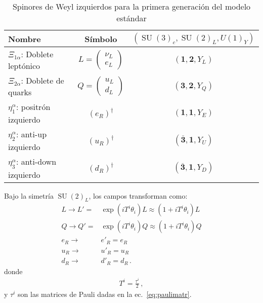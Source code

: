 \begin{frame}
\begin{table}
  \centering
  \begin{tabular}{l|c|c}\hline
    Nombre & Símbolo & $\left( \operatorname{SU}(3)_c, \operatorname{SU}(2)_L, U(1)_Y \right)$\\\hline
    $\Xi_{1\alpha}$: Doblete leptónico & $L=\displaystyle{\begin{pmatrix}
      \nu_L\\
      e_L      
    \end{pmatrix}}$ & $\left( \mathbf{1},\mathbf{2},Y_L \right)$\\
    $\Xi_{2\alpha}$: Doblete de quarks & $Q=\displaystyle{\begin{pmatrix}
      u_L\\
      d_L      
    \end{pmatrix}}$ & $\left( \mathbf{3},\mathbf{2},Y_Q \right)$\\
   $\eta^{\alpha}_1$: positrón izquierdo & $\left( e_R \right)^{\dagger}$&$\left(\mathbf{1},\mathbf{1},Y_{E}\right)$ \\
   $\eta^{\alpha}_2$: anti-up izquierdo & $\left( u_R \right)^{\dagger}$&$\left(\overline{\mathbf{3}},\mathbf{1},Y_{U}\right)$ \\
   $\eta^{\alpha}_3$: anti-down izquierdo & $\left( d_R \right)^{\dagger}$&$\left(\overline{\mathbf{3}},\mathbf{1},Y_{D}\right)$ \\
  \end{tabular}
  \caption{Spinores de Weyl izquierdos para la primera generación del modelo estándar}
  \label{tab:fgw}
\end{table}


Bajo la simetría $\operatorname{SU}(2)_L$, los campos transforman como:
 \begin{align}
  L\to L'=&\exp(i T^i \theta_i)L\approx(1+i T^i\theta_i)L\nonumber\\
  Q\to Q'=&\exp(i T^i \theta_i)Q\approx(1+i T^i\theta_i)Q\nonumber\\
  e_R\to& e'_R=e_R\nonumber\\
  u_R\to& u'_R=u_R\nonumber\\
  d_R\to& d'_R=d_R\,.
\end{align}
donde
\begin{align}
  T^i=\frac{\tau^i}{2}\,,
\end{align}
y $\tau^i$ son las matrices de Pauli dadas en la ec.~\eqref{eq:paulimatr}.

\end{frame}



